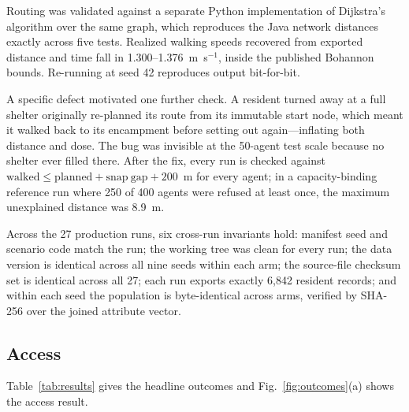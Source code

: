 \documentclass[graybox]{svmult}
\begin{document}
Routing was validated against a separate Python implementation of Dijkstra's
algorithm over the same graph, which reproduces the Java network distances
exactly across five tests. Realized walking speeds recovered from exported
distance and time fall in 1.300--1.376~m~s$^{-1}$, inside the published Bohannon
bounds. Re-running at seed 42 reproduces output bit-for-bit.

A specific defect motivated one further check. A resident turned away at a full
shelter originally re-planned its route from its immutable start node, which
meant it walked back to its encampment before setting out again---inflating both
distance and dose. The bug was invisible at the 50-agent test scale because no
shelter ever filled there. After the fix, every run is checked against
$\mathrm{walked} \leq \mathrm{planned} + \mathrm{snap\ gap} + 200$~m for every
agent; in a capacity-binding reference run where 250 of 400 agents were refused
at least once, the maximum unexplained distance was 8.9~m.

Across the 27 production runs, six cross-run invariants hold: manifest seed and
scenario code match the run; the working tree was clean for every run; the data
version is identical across all nine seeds within each arm; the source-file
checksum set is identical across all 27; each run exports exactly 6,842 resident
records; and within each seed the population is byte-identical across arms,
verified by SHA-256 over the joined attribute vector.

\subsection{Access}
\label{subsec:results-access}

Table~\ref{tab:results} gives the headline outcomes and
Fig.~\ref{fig:outcomes}(a) shows the access result.
\end{document}
